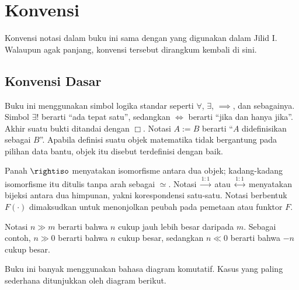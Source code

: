 
\section*{Konvensi}
\hypertarget{o014.aljabr2.prelude.conventions}{ }

Konvensi notasi dalam buku ini sama dengan yang digunakan dalam Jilid I.
Walaupun agak panjang, konvensi tersebut dirangkum kembali di sini.

\subsection*{Konvensi Dasar}

Buku ini menggunakan simbol logika standar seperti $\forall$, $\exists$,
$\implies$, dan sebagainya. Simbol $\exists !$ berarti ``ada tepat satu'',
sedangkan $\iff$ berarti ``jika dan hanya jika''. Akhir suatu bukti ditandai
dengan $\Box$. Notasi $A := B$ berarti ``$A$ didefinisikan sebagai $B$''.
Apabila definisi suatu objek matematika tidak bergantung pada pilihan data
bantu, objek itu disebut terdefinisi dengan baik.

Panah $\rightiso$ menyatakan isomorfisme antara dua objek; kadang-kadang
isomorfisme itu ditulis tanpa arah sebagai $\simeq$. Notasi
$\xrightarrow{1:1}$ atau
$\stackrel{1:1}{\longleftrightarrow}$ menyatakan bijeksi antara dua himpunan,
yakni korespondensi satu-satu. Notasi berbentuk $F(\cdot)$ dimaksudkan untuk
menonjolkan peubah pada pemetaan atau funktor $F$.

Notasi $n \gg m$ berarti bahwa $n$ cukup jauh lebih besar daripada $m$.
Sebagai contoh, $n \gg 0$ berarti bahwa $n$ cukup besar, sedangkan $n \ll 0$
berarti bahwa $-n$ cukup besar.

Buku ini banyak menggunakan bahasa diagram komutatif. Kasus yang paling
sederhana ditunjukkan oleh diagram berikut.

